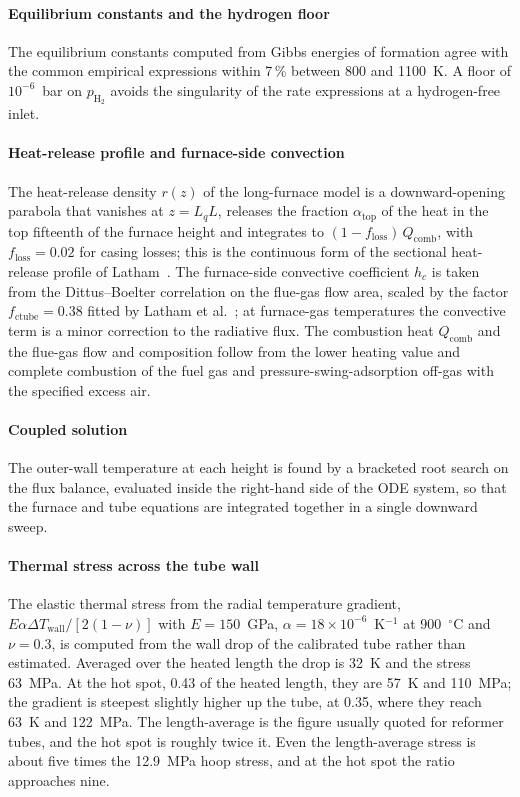 \documentclass[final,3p,times]{elsarticle}
\newcommand{\ce}[1]{\mathrm{#1}}
\begin{document}
\paragraph{Equilibrium constants and the hydrogen floor} The equilibrium constants computed from Gibbs energies of formation agree with the common empirical expressions within 7\,\% between 800 and 1100~K. A floor of $10^{-6}$~bar on $p_{\ce{H_2}}$ avoids the singularity of the rate expressions at a hydrogen-free inlet.

\paragraph{Heat-release profile and furnace-side convection} The heat-release density $r(z)$ of the long-furnace model is a downward-opening parabola that vanishes at $z = L_q L$, releases the fraction $\alpha_{\mathrm{top}}$ of the heat in the top fifteenth of the furnace height and integrates to $(1 - f_{\mathrm{loss}})\,Q_{\mathrm{comb}}$, with $f_{\mathrm{loss}} = 0.02$ for casing losses; this is the continuous form of the sectional heat-release profile of Latham~\cite{latham2011}. The furnace-side convective coefficient $h_c$ is taken from the Dittus--Boelter correlation on the flue-gas flow area, scaled by the factor $f_{\mathrm{ctube}} = 0.38$ fitted by Latham et al.~\cite{latham2011}; at furnace-gas temperatures the convective term is a minor correction to the radiative flux. The combustion heat $Q_{\mathrm{comb}}$ and the flue-gas flow and composition follow from the lower heating value and complete combustion of the fuel gas and pressure-swing-adsorption off-gas with the specified excess air.

\paragraph{Coupled solution} The outer-wall temperature at each height is found by a bracketed root search on the flux balance, evaluated inside the right-hand side of the ODE system, so that the furnace and tube equations are integrated together in a single downward sweep.

\paragraph{Thermal stress across the tube wall} The elastic thermal stress from the radial temperature gradient, $E\alpha\Delta T_{\mathrm{wall}}/[2(1-\nu)]$ with $E = 150$~GPa, $\alpha = 18 \times 10^{-6}$~K$^{-1}$ at 900~$^\circ$C and $\nu = 0.3$, is computed from the wall drop of the calibrated tube rather than estimated. Averaged over the heated length the drop is 32~K and the stress 63~MPa. At the hot spot, 0.43 of the heated length, they are 57~K and 110~MPa; the gradient is steepest slightly higher up the tube, at 0.35, where they reach 63~K and 122~MPa. The length-average is the figure usually quoted for reformer tubes, and the hot spot is roughly twice it. Even the length-average stress is about five times the 12.9~MPa hoop stress, and at the hot spot the ratio approaches nine.
\end{document}
